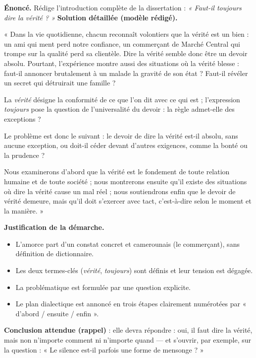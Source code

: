 \documentclass[11pt]{article}
\begin{document}
\begin{exoresolu}
\textbf{Énoncé.} Rédige l'introduction complète de la dissertation : \emph{« Faut-il toujours dire la vérité ? »}
\tcblower
\textbf{Solution détaillée (modèle rédigé).}

« Dans la vie quotidienne, chacun reconnaît volontiers que la vérité est un bien : un ami qui ment perd notre confiance, un commerçant de Marché Central qui trompe sur la qualité perd sa clientèle. Dire la vérité semble donc être un devoir absolu. Pourtant, l'expérience montre aussi des situations où la vérité blesse : faut-il annoncer brutalement à un malade la gravité de son état ? Faut-il révéler un secret qui détruirait une famille ?

La \emph{vérité} désigne la conformité de ce que l'on dit avec ce qui est ; l'expression \emph{toujours} pose la question de l'universalité du devoir : la règle admet-elle des exceptions ?

Le problème est donc le suivant : le devoir de dire la vérité est-il absolu, sans aucune exception, ou doit-il céder devant d'autres exigences, comme la bonté ou la prudence ?

Nous examinerons d'abord que la vérité est le fondement de toute relation humaine et de toute société ; nous montrerons ensuite qu'il existe des situations où dire la vérité cause un mal réel ; nous soutiendrons enfin que le devoir de vérité demeure, mais qu'il doit s'exercer avec tact, c'est-à-dire selon le moment et la manière. »

\textbf{Justification de la démarche.}
\begin{itemize}
\item L'amorce part d'un constat concret et camerounais (le commerçant), sans définition de dictionnaire.
\item Les deux termes-clés (\emph{vérité}, \emph{toujours}) sont définis et leur tension est dégagée.
\item La problématique est formulée par une question explicite.
\item Le plan dialectique est annoncé en trois étapes clairement numérotées par « d'abord / ensuite / enfin ».
\end{itemize}
\textbf{Conclusion attendue (rappel)} : elle devra répondre : oui, il faut dire la vérité, mais non n'importe comment ni n'importe quand — et s'ouvrir, par exemple, sur la question : « Le silence est-il parfois une forme de mensonge ? »
\end{exoresolu}
\end{document}
